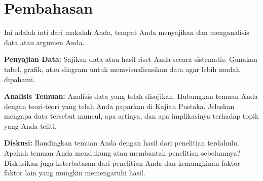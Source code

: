 %
%
%
\chapter{Pembahasan}


Ini adalah inti dari makalah Anda, tempat Anda menyajikan dan menganalisis data atau argumen Anda.

\textbf{Penyajian Data:} Sajikan data atau hasil riset Anda secara sistematis. Gunakan tabel, grafik, atau diagram untuk memvisualisasikan data agar lebih mudah dipahami.

\textbf{Analisis Temuan:} Analisis data yang telah disajikan. Hubungkan temuan Anda dengan teori-teori yang telah Anda paparkan di Kajian Pustaka. Jelaskan mengapa data tersebut muncul, apa artinya, dan apa implikasinya terhadap topik yang Anda teliti.

\textbf{Diskusi:} Bandingkan temuan Anda dengan hasil dari penelitian terdahulu. Apakah temuan Anda mendukung atau membantah penelitian sebelumnya? Diskusikan juga keterbatasan dari penelitian Anda dan kemungkinan faktor-faktor lain yang mungkin memengaruhi hasil.

